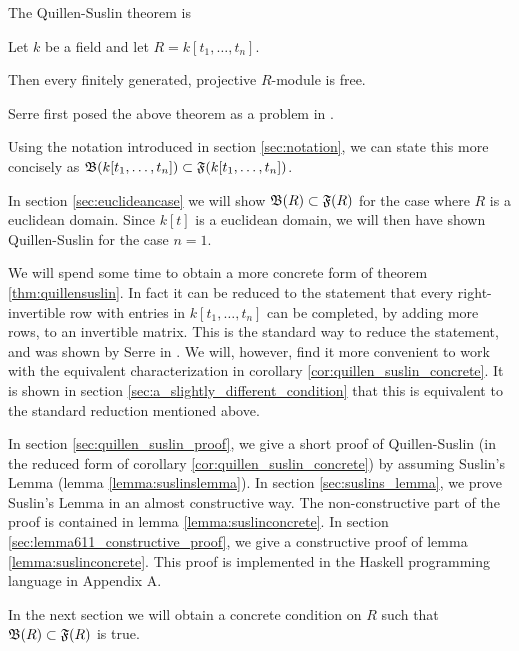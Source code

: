 The Quillen-Suslin theorem is

\begin{theorem}
\label{thm:quillensuslin}
  Let $k$ be a field and let $R = k[t_1, \dots, t_n]$.

  Then every finitely generated, projective $R$-module is free.
\end{theorem}

Serre first posed the above theorem as a problem in \citep{serre55}.

Using the notation introduced in section \ref{sec:notation}, we can state this more concisely as
$\mathfrak B(k[t_1, \dots, t_n]) \subset \mathfrak F(k[t_1,\dots,t_n])$.

In section \ref{sec:euclideancase} we will show $\mathfrak B(R) \subset \mathfrak F(R)$ for the case where $R$ is a euclidean domain. Since $k[t]$ is a euclidean domain, we will then have shown Quillen-Suslin for the case $n=1$.

We will spend some time to obtain a more concrete form of theorem \ref{thm:quillensuslin}.
In fact it can be reduced to the statement that every right-invertible row with entries in $k[t_1, \dots, t_n]$
can be completed, by adding more rows, to an invertible matrix.
This is the standard way to reduce the statement, and was shown by Serre in \citep{serre58}.
We will, however, find it more convenient to work with the equivalent characterization in corollary \ref{cor:quillen_suslin_concrete}. It is shown in section \ref{sec:a_slightly_different_condition} that this is equivalent to the standard reduction mentioned above.



In section \ref{sec:quillen_suslin_proof}, we give a short proof of Quillen-Suslin (in the reduced form of corollary \ref{cor:quillen_suslin_concrete}) by assuming Suslin's Lemma (lemma \ref{lemma:suslinslemma}).
In section \ref{sec:suslins_lemma}, we prove Suslin's Lemma in an almost constructive way.
The non-constructive part of the proof is contained in lemma \ref{lemma:suslinconcrete}.
In section \ref{sec:lemma611_constructive_proof}, we give a constructive proof of lemma \ref{lemma:suslinconcrete}.
This proof is implemented in the Haskell programming language in Appendix A.

In the next section we will obtain a concrete condition on $R$ such that $\mathfrak B(R) \subset \mathfrak F(R)$ is true.

